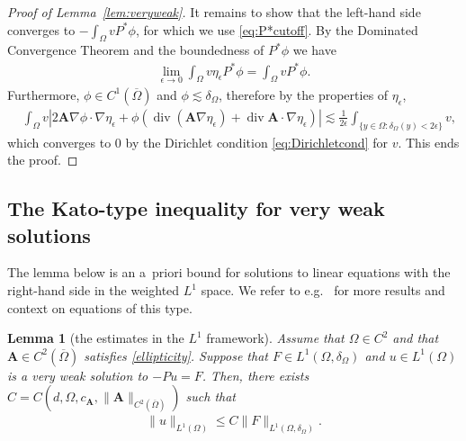 \documentclass[12pt,a4paper]{amsart}
\newtheorem{lemma}[theorem]{\bf Lemma}
\theoremstyle{definition}
\newcommand{\A}{\mathbf{A}}
\newcommand*\Div{\operatorname{div}}
\begin{document}
\begin{proof}[Proof of Lemma~\ref{lem:veryweak}]
    It remains to show that the left-hand side converges to $-\int_\Omega v P^* \phi$, for which we use \eqref{eq:P*cutoff}. By the Dominated Convergence Theorem and the boundedness of $P^*\phi$ we have 
    \begin{align*}
        \lim\limits_{\epsilon\to 0}\int_\Omega v \eta_\epsilon P^* \phi = \int_\Omega v P^* \phi.
    \end{align*}
    Furthermore, $\phi\in  C^1(\overline{\Omega})$ and $\phi\lesssim \delta_\Omega$, therefore by the properties of $\eta_\epsilon$, 
    \begin{align*}
        &\int_\Omega v |2\A  \nabla \phi \cdot \nabla \eta_\epsilon + \phi(\Div (\A \nabla \eta_\epsilon) + \Div \A \cdot \nabla \eta_\epsilon)|
        \lesssim\frac 1 {2\epsilon} \int_{\{y \in \Omega: \delta_\Omega(y)<2\epsilon\}} v,
    \end{align*}
    which converges to 0 by the Dirichlet condition \eqref{eq:Dirichletcond} for $v$. This ends the proof.
\end{proof}\medskip

\subsection{The Kato-type inequality for very weak solutions} 

The lemma below is an a~priori bound for solutions to linear equations with the right-hand side in the weighted $L^1$ space. We refer to e.g.~\cite{MR2530605} for more results and context on equations of this type.

\begin{lemma}[the estimates in the $L^1$ framework]\label{lem:aprioriL1}
    Assume that $\Omega \in C^{2}$ and that $\A\in C^{2}(\overline{\Omega})$ satisfies \eqref{ellipticity}. Suppose that $F\in L^1(\Omega,\delta_\Omega)$ and $u\in L^1(\Omega)$ is a very weak solution to $-Pu = F$. Then, there exists $C=C(d,\Omega,c_\A,\|\A\|_{C^2(\overline{\Omega})})$ such that
    \begin{align*}
        \|u\|_{L^1(\Omega)} \leq C\|F\|_{L^1(\Omega,\delta_\Omega)}.
    \end{align*}
\end{lemma}
\end{document}
